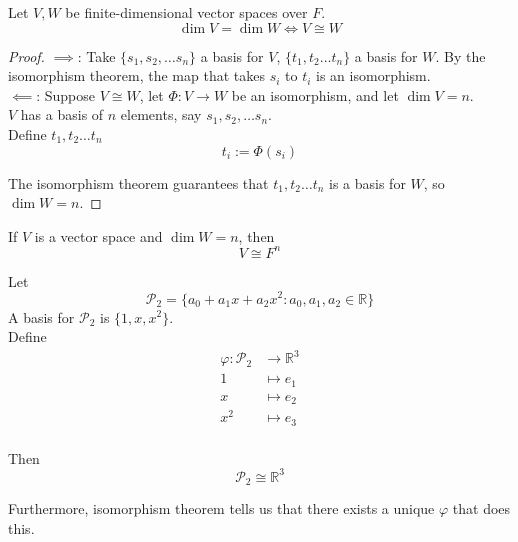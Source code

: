 \begin{theorem}
    Let $V, W$ be finite-dimensional vector spaces over $F$. 
    \[
        \dim V = \dim W \iff V \cong W
    \]
\end{theorem}

\begin{proof}

$\implies$: Take $\{ s_1, s_2, \hdots s_n \} $ a basis for $V$, $\{ t_1, t_2 \hdots t_n \} $ a basis for $W$. By the isomorphism theorem, the map that takes $s_i$ to $t_i$ is an isomorphism. \\

$\impliedby$: Suppose $V \cong W$, let $\Phi: V \to W$ be an isomorphism, and let $\dim V = n$. \\

$V$ has a basis of $n$ elements, say $s_1, s_2, \hdots s_n$. \\

Define $t_1, t_2 \hdots t_n$ 
\[
    t_i := \Phi(s_i)
\]

The isomorphism theorem guarantees that $t_1, t_2 \hdots t_n$ is a basis for $W$, so $\dim W = n$. 
\end{proof}
\begin{corollary}
    If $V$ is a vector space and $\dim W = n$, then 
    \[
        V \cong F^n
    \]
\end{corollary}

\begin{example}
    Let 
    \[
        \mathcal{P}_2 = \{ a_0 + a_1 x + a_2 x^2: a_0, a_1 , a_2 \in \mathbb{R} \} 
    \]
    A basis for $\mathcal{P}_2$ is $ \{ 1, x, x^2 \} $.  \\

    Define 
    \begin{align*}
        \varphi: \mathcal{P}_2 &\to \mathbb{R}^3 \\
        1 &\mapsto e_1 \\
        x &\mapsto e_2 \\
        x^2 &\mapsto e_3 \\
    \end{align*}

    Then 
    \[
        \mathcal{P}_2 \cong \mathbb{R}^3
    \]

    Furthermore, isomorphism theorem tells us that there exists a unique $\varphi$ that does this.
\end{example}














\newpage